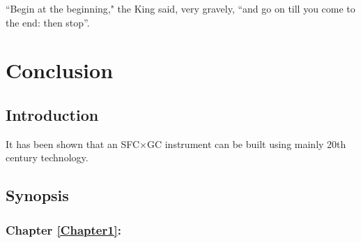 
\begin{savequote}[\quotewidth]
``Begin at the beginning," the King said, very gravely, ``and go on till you come to the end: then stop''.
\end{savequote}

\chapter{Conclusion} %


\label{Chapter8} %



\section{Introduction}

It has been shown that an SFC×GC instrument can be built using mainly 20th century technology. 

\section{Synopsis}

\subsection{Chapter \ref{Chapter1}:  }

